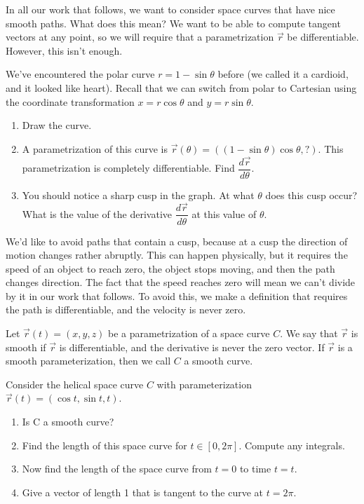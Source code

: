 In all our work that follows, we want to consider space curves that have nice smooth paths.  What does this mean?  We want to be able to compute tangent vectors at any point, so we will require that a parametrization $\vec r$ be differentiable.  However, this isn't enough.  
\begin{problem}
 We've encountered the polar curve $r = 1-\sin\theta$ before (we called it a cardioid, and it looked like heart).  Recall that we can switch from polar to Cartesian using the coordinate transformation $x=r\cos\theta$ and $y=r\sin\theta$. 
\begin{enumerate}
 \item Draw the curve.
 \item A parametrization of this curve is $\vec r(\theta) = ((1-\sin\theta)\cos\theta, ?)$.  This parametrization is completely differentiable.  Find $\dfrac{d\vec r}{d\theta}$.
 \item You should notice a sharp cusp in the graph. At what $\theta$ does this cusp occur?  What is the value of the derivative $\dfrac{d\vec r}{d\theta}$ at this value of $\theta$. 
\end{enumerate}
\end{problem}

We'd like to avoid paths that contain a cusp, because at a cusp the direction of motion changes rather abruptly. This can happen physically, but it requires the speed of an object to reach zero, the object stops moving, and then the path changes direction. The fact that the speed reaches zero will mean we can't divide by it in our work that follows.  To avoid this, we make a definition that requires the path is differentiable, and the velocity is never zero.

\begin{definition}
 Let $\vec r(t)=(x,y,z)$ be a parametrization of a space curve $C$. We say that $\vec r$ is smooth if $\vec r$ is differentiable, and the derivative is never the zero vector. If $\vec r$ is a smooth parameterization, then we call $C$ a smooth curve. 
\end{definition}


\begin{problem}
%
%
 Consider the helical space curve $C$ with parameterization $\vec r(t)=(\cos t, \sin t, t)$. 
\begin{enumerate}
 \item Is C a smooth curve?  
 \item Find the length of this space curve for $t\in[0,2\pi]$. Compute any integrals. 
 \item Now find the length of the space curve from $t=0$ to time $t=t$. 
 \item Give a vector of length 1 that is tangent to the curve at $t=2\pi$. 
\end{enumerate}
\end{problem}

